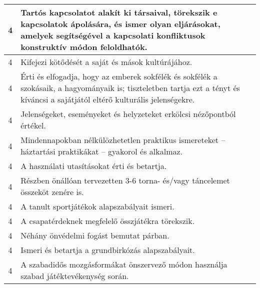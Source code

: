 \begin{longtable}{c | p{12cm} }
                                
                                          4 &  Tartós kapcsolatot alakít ki társaival, törekszik e kapcsolatok ápolására, és ismer olyan eljárásokat, amelyek segítségével a kapcsolati konfliktusok konstruktív módon feloldhatók. \\ \hline
                                          4 &  Kifejezi kötődését a saját és mások kultúrájához. \\ \hline
                                          4 &  Érti és elfogadja, hogy az emberek sokfélék és sokfélék a szokásaik, a hagyományaik is; tiszteletben tartja ezt a tényt és kíváncsi a sajátjától eltérő kulturális jelenségekre. \\ \hline
                                          4 &  Jelenségeket, eseményeket és helyzeteket erkölcsi nézőpontból értékel. \\ \hline
                                          4 &  Mindennapokban nélkülözhetetlen praktikus ismereteket – háztartási praktikákat – gyakorol és alkalmaz. \\ \hline
                                          4 &  A használati utasításokat érti és betartja. \\ \hline
                                          4 &  Részben önállóan tervezetten 3-6 torna- és/vagy táncelemet összeköt zenére is. \\ \hline
                                          4 &  A tanult sportjátékok alapszabályait ismeri. \\ \hline
                                          4 &  A csapatérdeknek megfelelő összjátékra törekszik. \\ \hline
                                          4 &  Néhány önvédelmi fogást bemutat párban. \\ \hline
                                          4 &  Ismeri és betartja a grundbirkózás alapszabályait. \\ \hline
                                          4 &  A szabadidős mozgásformákat önszervező módon használja szabad játéktevékenység során. \\ \hline
                                      
                        \end{longtable}
            \clearpage

